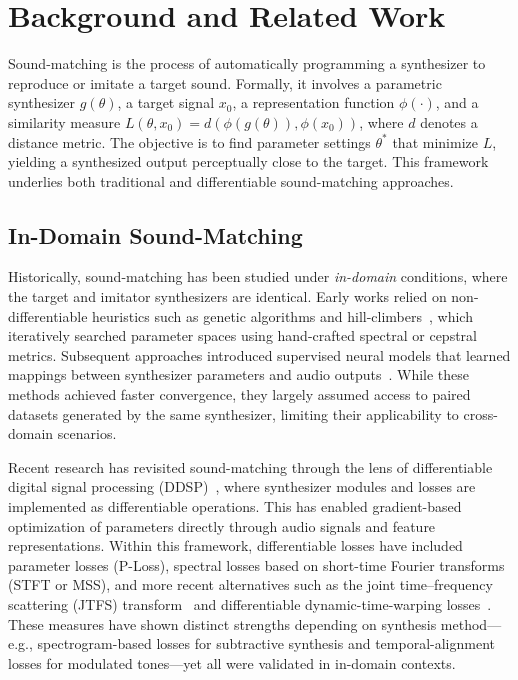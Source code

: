 \documentclass[runningheads,20pt]{llncs}
\begin{document}
\section{Background and Related Work}
\label{sec:background}

Sound-matching is the process of automatically programming a synthesizer to reproduce or imitate a target sound.  
Formally, it involves a parametric synthesizer $g(\theta)$, a target signal $x_0$, a representation function $\phi(\cdot)$, and a similarity measure $L(\theta, x_0) = d(\phi(g(\theta)), \phi(x_0))$, where $d$ denotes a distance metric.  
The objective is to find parameter settings $\theta^*$ that minimize $L$, yielding a synthesized output perceptually close to the target.  
This framework underlies both traditional and differentiable sound-matching approaches.

\subsection{In-Domain Sound-Matching}
Historically, sound-matching has been studied under \emph{in-domain} conditions, where the target and imitator synthesizers are identical.  
Early works relied on non-differentiable heuristics such as genetic algorithms and hill-climbers~\cite{horner1993machine,mitchell2007evolutionary}, which iteratively searched parameter spaces using hand-crafted spectral or cepstral metrics.  
Subsequent approaches introduced supervised neural models that learned mappings between synthesizer parameters and audio outputs~\cite{yee2018auto,esling2019flow,masuda2021synthesizer}.  
While these methods achieved faster convergence, they largely assumed access to paired datasets generated by the same synthesizer, limiting their applicability to cross-domain scenarios.

Recent research has revisited sound-matching through the lens of differentiable digital signal processing (DDSP)~\cite{engel2020ddsp}, where synthesizer modules and losses are implemented as differentiable operations.  
This has enabled gradient-based optimization of parameters directly through audio signals and feature representations.  
Within this framework, differentiable losses have included parameter losses (P-Loss), spectral losses based on short-time Fourier transforms (STFT or MSS), and more recent alternatives such as the joint time–frequency scattering (JTFS) transform~\cite{vahidi2023mesostructures} and differentiable dynamic-time-warping losses~\cite{cuturi2017softdtw}.  
These measures have shown distinct strengths depending on synthesis method—e.g., spectrogram-based losses for subtractive synthesis and temporal-alignment losses for modulated tones—yet all were validated in in-domain contexts.
\end{document}
